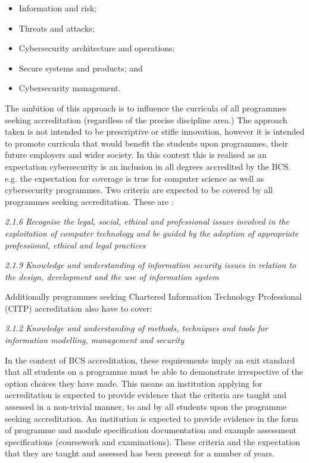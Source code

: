 \documentclass[conference]{IEEEtran}
\begin{document}
\begin{itemize}
    \item Information and risk;
    \item Threats and attacks;
    \item Cybersecurity architecture and operations;
    \item Secure systems and products; and 
    \item Cybersecurity management.
\end{itemize}

The ambition of this approach is to influence the curricula of all programmes seeking accreditation (regardless of the precise discipline area.)  The approach taken is not intended to be prescriptive or stifle innovation, however it is intended to promote curricula that would benefit the students upon programmes, their future employers and wider society.  In this context this is realised as an expectation cybersecurity is an inclusion in all degrees accredited by the BCS. e.g. the expectation for coverage is true for computer science as well as cybersecurity programmes. Two criteria are expected to be covered by all programmes seeking accreditation. These are \cite{BCS2018a}:

{\emph{2.1.6 Recognise the legal, social, ethical and professional issues involved in the exploitation of computer technology and be guided by the adoption of appropriate professional, ethical and legal practices}}

{\emph{2.1.9 Knowledge and understanding of information security issues in relation to the design, development and the use of information system}}

Additionally programmes seeking Chartered Information Technology Professional (CITP) accreditation also have to cover:

{\emph{3.1.2 Knowledge and understanding of methods, techniques and tools for information modelling, management and security}}

In the context of BCS accreditation, these requirements imply an exit standard that all students on a programme must be able to demonstrate irrespective of the option choices they have made. This means an institution applying for accreditation is expected to provide evidence that the criteria are taught and assessed in a non-trivial manner, to and by all students upon the programme seeking accreditation. An institution is expected to provide evidence in the form of programme and module specification documentation and example assessment specifications (coursework and examinations). These criteria and the expectation that they are taught and assessed has been present for a number of years.
\end{document}
